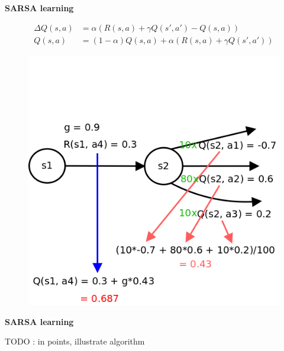 \documentclass[xcolor=dvipsnames]{beamer}
\begin{document}
\begin{frame}{\bf SARSA learning}

\begin{align*}
\Delta Q(s, a) &= \alpha(R(s, a) + \gamma Q(s', a') - Q(s, a)) \\
Q(s, a) &= (1-\alpha)Q(s, a) + \alpha(R(s, a) + \gamma Q(s', a'))
\end{align*}

\begin{figure}
  \includegraphics[scale=0.23]{../../diagrams/sarsa_learning_detail.png}
\end{figure}

\end{frame}



\begin{frame}{\bf SARSA learning}

TODO : in points, illustrate algorithm

\end{frame}
\end{document}
